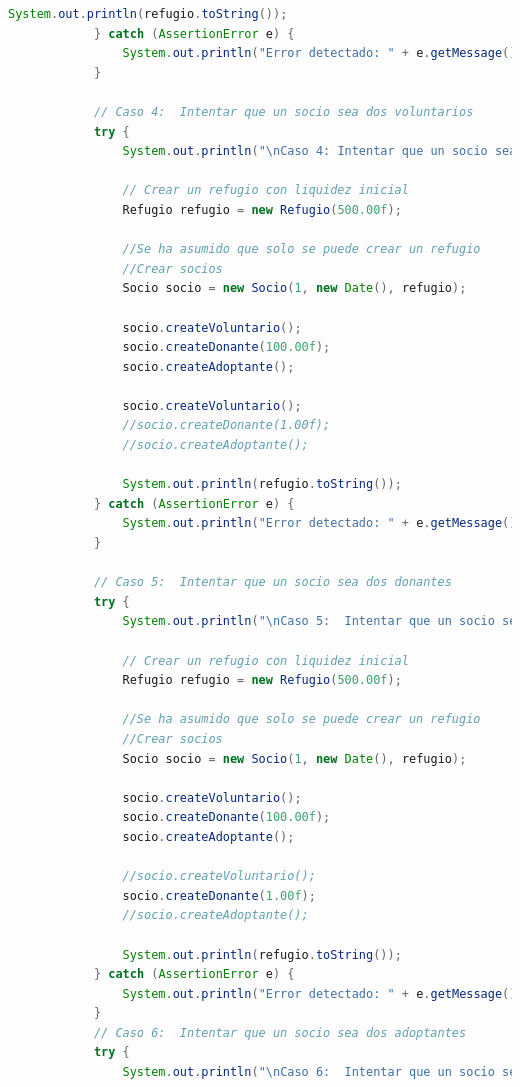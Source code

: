 \begin{lstlisting}[style = javaNormal, language=Java]
                System.out.println(refugio.toString());
            } catch (AssertionError e) {
                System.out.println("Error detectado: " + e.getMessage());
            }
    
            // Caso 4:  Intentar que un socio sea dos voluntarios
            try {
                System.out.println("\nCaso 4: Intentar que un socio sea dos donantes, voluntarios y adoptantes\n");
    
                // Crear un refugio con liquidez inicial
                Refugio refugio = new Refugio(500.00f);
    
                //Se ha asumido que solo se puede crear un refugio
                //Crear socios
                Socio socio = new Socio(1, new Date(), refugio);
    
                socio.createVoluntario();
                socio.createDonante(100.00f);
                socio.createAdoptante();
    
                socio.createVoluntario();
                //socio.createDonante(1.00f);
                //socio.createAdoptante();
    
                System.out.println(refugio.toString());
            } catch (AssertionError e) {
                System.out.println("Error detectado: " + e.getMessage());
            }
    
            // Caso 5:  Intentar que un socio sea dos donantes
            try {
                System.out.println("\nCaso 5:  Intentar que un socio sea dos donantes\n");
    
                // Crear un refugio con liquidez inicial
                Refugio refugio = new Refugio(500.00f);
    
                //Se ha asumido que solo se puede crear un refugio
                //Crear socios
                Socio socio = new Socio(1, new Date(), refugio);
    
                socio.createVoluntario();
                socio.createDonante(100.00f);
                socio.createAdoptante();
    
                //socio.createVoluntario();
                socio.createDonante(1.00f);
                //socio.createAdoptante();
    
                System.out.println(refugio.toString());
            } catch (AssertionError e) {
                System.out.println("Error detectado: " + e.getMessage());
            }
            // Caso 6:  Intentar que un socio sea dos adoptantes
            try {
                System.out.println("\nCaso 6:  Intentar que un socio sea dos adoptantes\n");
    

\end{lstlisting}
